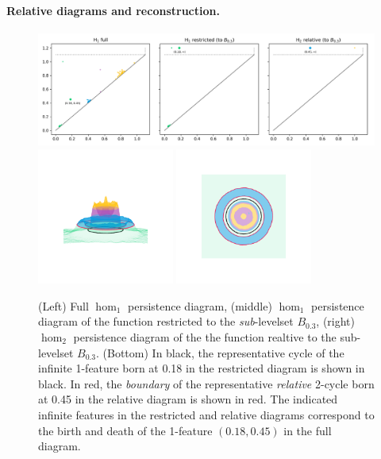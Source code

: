 \paragraph{Relative diagrams and reconstruction.}

\begin{figure}[htbp]\label{fig:relative1}
  \centering
  \includegraphics[width=\textwidth]{scripts/figures/relative/dgm-0_0.png}
  \includegraphics[trim=500 800 500 800, clip, width=0.4\textwidth]{scripts/figures/relative/surf_side-0_0.png}
  \includegraphics[trim=500 500 500 500, clip, width=0.4\textwidth]{scripts/figures/relative/surf_top-0_0.png}
  \caption{(Left) Full $\hom_1$ persistence diagram, (middle) $\hom_1$ persistence diagram of the function restricted to the \emph{sub}-levelset $B_{0.3}$, (right) $\hom_2$ persistence diagram of the the function realtive to the sub-levelset $B_{0.3}$.
  (Bottom) In black, the representative cycle of the infinite 1-feature born at 0.18 in the restricted diagram is shown in black.
  In red, the \emph{boundary} of the representative \emph{relative} 2-cycle born at 0.45 in the relative diagram is shown in red.
  The indicated infinite features in the restricted and relative diagrams correspond to the birth and death of the 1-feature $(0.18, 0.45)$ in the full diagram.
  }
\end{figure}


